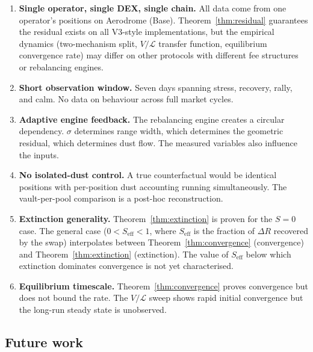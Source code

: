 \documentclass[11pt,a4paper]{article}
\begin{document}
\begin{enumerate}[leftmargin=*]
    \item \textbf{Single operator, single DEX, single chain.} All data come from one operator's positions on Aerodrome (Base). Theorem~\ref{thm:residual} guarantees the residual exists on all V3-style implementations, but the empirical dynamics (two-mechanism split, $V/\mathcal{L}$ transfer function, equilibrium convergence rate) may differ on other protocols with different fee structures or rebalancing engines.

    \item \textbf{Short observation window.} Seven days spanning stress, recovery, rally, and calm. No data on behaviour across full market cycles.

    \item \textbf{Adaptive engine feedback.} The rebalancing engine creates a circular dependency. $\sigma$ determines range width, which determines the geometric residual, which determines dust flow. The measured variables also influence the inputs.

    \item \textbf{No isolated-dust control.} A true counterfactual would be identical positions with per-position dust accounting running simultaneously. The vault-per-pool comparison is a post-hoc reconstruction.

    \item \textbf{Extinction generality.} Theorem~\ref{thm:extinction} is proven for the $S = 0$ case. The general case ($0 < S_{\text{eff}} < 1$, where $S_{\text{eff}}$ is the fraction of $\Delta R$ recovered by the swap) interpolates between Theorem~\ref{thm:convergence} (convergence) and Theorem~\ref{thm:extinction} (extinction). The value of $S_{\text{eff}}$ below which extinction dominates convergence is not yet characterised.

    \item \textbf{Equilibrium timescale.} Theorem~\ref{thm:convergence} proves convergence but does not bound the rate. The $V/\mathcal{L}$ sweep shows rapid initial convergence but the long-run steady state is unobserved.
\end{enumerate}

\subsection{Future work}\label{sec:future}
\end{document}
